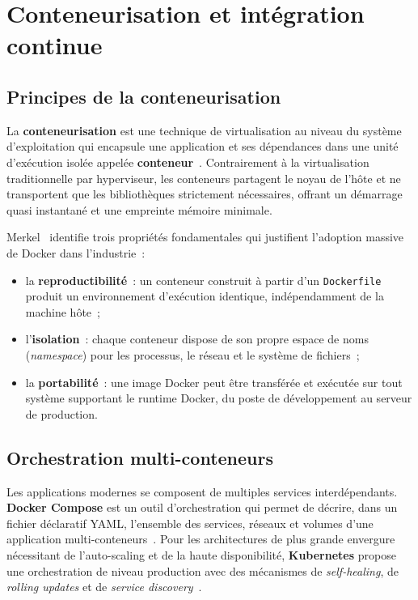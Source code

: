 \section{Conteneurisation et intégration continue}
\label{sec:conteneurisation}

\subsection{Principes de la conteneurisation}

La \textbf{conteneurisation} est une technique de virtualisation au niveau du système d'exploitation qui encapsule une application et ses dépendances dans une unité d'exécution isolée appelée \textbf{conteneur}~\cite{merkel2014}. Contrairement à la virtualisation traditionnelle par hyperviseur, les conteneurs partagent le noyau de l'hôte et ne transportent que les bibliothèques strictement nécessaires, offrant un démarrage quasi instantané et une empreinte mémoire minimale.

Merkel~\cite{merkel2014} identifie trois propriétés fondamentales qui justifient l'adoption massive de Docker dans l'industrie~:

\begin{itemize}[noitemsep]
    \item la \textbf{reproductibilité}~: un conteneur construit à partir d'un \texttt{Dockerfile} produit un environnement d'exécution identique, indépendamment de la machine hôte~;
    \item l'\textbf{isolation}~: chaque conteneur dispose de son propre espace de noms (\textit{namespace}) pour les processus, le réseau et le système de fichiers~;
    \item la \textbf{portabilité}~: une image Docker peut être transférée et exécutée sur tout système supportant le runtime Docker, du poste de développement au serveur de production.
\end{itemize}

\subsection{Orchestration multi-conteneurs}

Les applications modernes se composent de multiples services interdépendants. \textbf{Docker Compose} est un outil d'orchestration qui permet de décrire, dans un fichier déclaratif YAML, l'ensemble des services, réseaux et volumes d'une application multi-conteneurs~\cite{merkel2014}. Pour les architectures de plus grande envergure nécessitant de l'auto-scaling et de la haute disponibilité, \textbf{Kubernetes} propose une orchestration de niveau production avec des mécanismes de \textit{self-healing}, de \textit{rolling updates} et de \textit{service discovery}~\cite{burns2018}.

